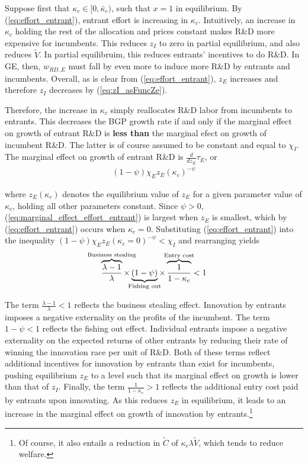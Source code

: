 \documentclass[11pt,english]{article}
\theoremstyle{remark}
\begin{document}
Suppose first that $\kappa_c \in [0, \bar{\kappa}_c)$, such that $x = 1$ in equilibrium. By (\ref{eq:effort_entrant}), entrant effort is increasing in $\kappa_c$. Intuitively, an increase in $\kappa_c$ holding the rest of the allocation and prices constant makes R\&D more expensive for incumbents. This reduces $z_I$ to zero in partial equilibrium, and also reduces $\tilde{V}$. In partial equilibruim, this reduces entrants' incentives to do R\&D. In GE, then, $w_{RD,E}$ must fall by even more to induce more R\&D by entrants and incumbents. Overall, as is clear from (\ref{eq:effort_entrant}), $z_E$ increases and therefore $z_I$ decreases by (\ref{eq:zI_asFuncZe}).

Therefore, the increase in $\kappa_c$ simply reallocates R\&D labor from incumbents to entrants. This decreases the BGP growth rate if and only if the marginal effect on growth of entrant R\&D is \textbf{less than} the marginal efect on growth of incumbent R\&D. The latter is of course assumed to be constant and equal to $\chi_I$. The marginal effect on growth of entrant R\&D is $\frac{d}{dz_E} \tau_E$, or
\begin{align}
(1-\psi) \chi_E z_E (\kappa_c)^{-\psi} \label{eq:marginal_effect_effort_entrant}
\end{align}

where $z_E(\kappa_c)$ denotes the equilibrium value of $z_E$ for a given parameter value of $\kappa_c$, holding all other parameters constant. Since $\psi > 0$, (\ref{eq:marginal_effect_effort_entrant}) is largest when $z_E$ is smallest, which by (\ref{eq:effort_entrant}) occurs when $\kappa_c = 0$. Substituting (\ref{eq:effort_entrant}) into the inequality $(1-\psi) \chi_E z_E(\kappa_c = 0)^{-\psi} < \chi_I$ and rearranging yields 
\begin{align}
\overbrace{\frac{\lambda-1}{\lambda}}^{\mathclap{\text{Business stealing}}} \times \underbrace{(1-\psi)}_{\mathclap{\text{Fishing out}}} \times  \overbrace{\frac{1}{1-\kappa_{e}}}^{\mathclap{\text{Entry cost}}}< 1 \label{cs:growth_decreasing_condition}
\end{align}

The term $\frac{\lambda - 1}{\lambda} < 1$ reflects the business stealing effect. Innovation by entrants imposes a negative externality on the profits of the incumbent. The term $1-\psi < 1$ reflects the fishing out effect. Individual entrants impose a negative externality on the expected returns of other entrants by reducing their rate of winning the innovation race per unit of R\&D. Both of these terms reflect additional incentives for innovation by entrants than exist for incumbents, pushing equilibrium $z_E$ to a level such that its marginal effect on growth is lower than that of $z_I$. Finally, the term $\frac{1}{1-\kappa_e} > 1$ reflects the additional entry cost paid by entrants upon innovating. As this reduces $z_E$ in equilibrium, it leads to an increase in the marginal effect on growth of innovation by entrants.\footnote{Of course, it also entails a reduction in $\tilde{C}$ of $\kappa_e \lambda \tilde{V}$, which tends to reduce welfare.}
\end{document}
